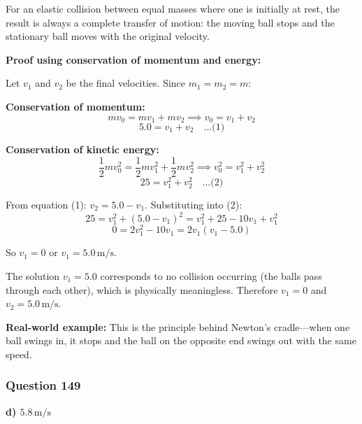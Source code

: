 \documentclass[12pt,letterpaper]{article}
\begin{document}
\begin{explanationbox}
For an elastic collision between equal masses where one is initially at rest, the result is always a complete transfer of motion: the moving ball stops and the stationary ball moves with the original velocity.

\textbf{Proof using conservation of momentum and energy:}

Let $v_1$ and $v_2$ be the final velocities. Since $m_1 = m_2 = m$:

\textbf{Conservation of momentum:}
\[
mv_0 = mv_1 + mv_2 \implies v_0 = v_1 + v_2
\]
\[
5.0 = v_1 + v_2 \quad \text{...(1)}
\]

\textbf{Conservation of kinetic energy:}
\[
\frac{1}{2}mv_0^2 = \frac{1}{2}mv_1^2 + \frac{1}{2}mv_2^2 \implies v_0^2 = v_1^2 + v_2^2
\]
\[
25 = v_1^2 + v_2^2 \quad \text{...(2)}
\]

From equation (1): $v_2 = 5.0 - v_1$. Substituting into (2):
\[
25 = v_1^2 + (5.0 - v_1)^2 = v_1^2 + 25 - 10v_1 + v_1^2
\]
\[
0 = 2v_1^2 - 10v_1 = 2v_1(v_1 - 5.0)
\]

So $v_1 = 0$ or $v_1 = 5.0\,\text{m/s}$.

The solution $v_1 = 5.0$ corresponds to no collision occurring (the balls pass through each other), which is physically meaningless. Therefore $v_1 = 0$ and $v_2 = 5.0\,\text{m/s}$.

\textbf{Real-world example:} This is the principle behind Newton's cradle---when one ball swings in, it stops and the ball on the opposite end swings out with the same speed.
\end{explanationbox}

\subsubsection*{Question 149}

\begin{answerbox}
\textbf{d) $5.8\,\text{m/s}$}
\end{answerbox}
\end{document}
